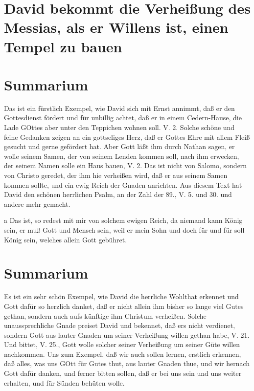 \section[David bekommt die Verheißung des Messias, als er]{David bekommt die Verheißung des Messias, als er Willens ist, einen Tempel zu bauen}

\section{Summarium}

Das ist ein fürstlich Exempel, wie David sich mit Ernst annimmt, daß er den Gottesdienst fördert und für unbillig achtet, daß er in einem Cedern-Hause, die Lade GOttes aber unter den Teppichen wohnen soll. V. 2. Solche schöne und feine Gedanken zeigen an ein gottseliges Herz, daß er Gottes Ehre mit allem Fleiß gesucht und gerne gefördert hat. Aber Gott läßt ihm durch Nathan sagen, er wolle seinem Samen, der von seinem Lenden kommen soll, nach ihm erwecken, der seinem Namen solle ein Haus bauen, V. 2. Das ist nicht von Salomo, sondern von Christo geredet, der ihm hie verheißen wird, daß er aus seinem Samen kommen sollte, und ein ewig Reich der Gnaden anrichten. Aus diesem Text hat David den schönen herrlichen Psalm, an der Zahl der 89., V. 5. und 30. und andere mehr gemacht.

a Das ist, so redest mit mir von solchem ewigen Reich, da niemand kann König sein, er muß Gott und Mensch sein, weil er mein Sohn und doch für und für soll König sein, welches allein Gott gebühret.

\section{Summarium}

Es ist ein sehr schön Exempel, wie David die herrliche Wohlthat erkennet und Gott dafür so herzlich danket, daß er nicht allein ihm bisher so lange viel Gutes gethan, sondern auch aufs künftige ihm Christum verheißen. Solche unaussprechliche Gnade preiset David und bekennet, daß ers nicht verdienet, sondern Gott aus lauter Gnaden um seiner Verheißung willen gethan habe, V. 21. Und bittet, V. 25., Gott wolle solcher seiner Verheißung um seiner Güte willen nachkommen. Uns zum Exempel, daß wir auch sollen lernen, erstlich erkennen, daß alles, was uns GOtt für Gutes thut, aus lauter Gnaden thue, und wir hernach Gott dafür danken, und ferner bitten sollen, daß er bei uns sein und uns weiter erhalten, und für Sünden behüten wolle.

